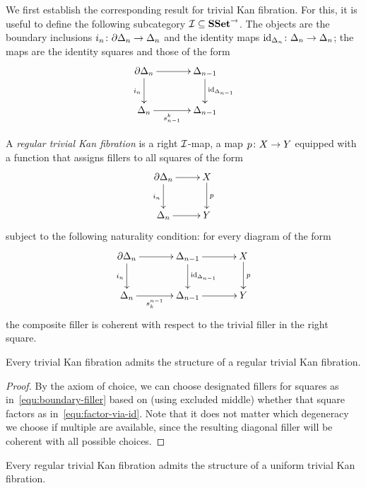 \documentclass[reqno,10pt,a4paper,oneside]{amsart}
\begin{document}
 We first establish the corresponding result for 
 trivial Kan fibration. For this, it is useful to define the following subcategory $\cal{I} \subseteq \SSet^\to$. The objects are the boundary inclusions
$i_n \co \partial \Delta_n \to \Delta_n$ and the identity maps $\id_{\Delta_n} \co \Delta_n \to \Delta_n$; the
maps are the identity squares and those of the form
 \[
\xymatrix@C=1.2cm{
  \partial \Delta_n
  \ar[r]
  \ar[d]_{i_n}
&
  \Delta_{n-1}
  \ar[d]^{\id_{\Delta_{n-1}}}
\\
  \Delta_n
  \ar[r]_-{s^k_{n-1}}
&
  \Delta_{n-1}
}
\] 


\begin{definition} A \emph{regular trivial Kan fibration} is a right $\cal{I}$-map, \ie a map $p \co X \to Y$ 
equipped with a function that assigns fillers to all squares of the form
\begin{equation}
\label{equ:boundary-filler}
\xycenter{
\partial \Delta_n \ar[d]_{i_n} \ar[r] & X \ar[d]^{p} \\
\Delta_n \ar[r] & Y } 
\end{equation}
subject to the following naturality condition: for every diagram of the form
\begin{equation}
\label{equ:factor-via-id}
{\vcenter{\hbox{\xymatrix@C=1.2cm{
  \partial \Delta_n
  \ar[r]
  \ar[d]_{i_n}
&
  \Delta_{n-1}
  \ar[r]
  \ar[d]^{\id_{\Delta_{n-1}}}
&
  X
  \ar[d]^{p}
\\
  \Delta_n
  \ar[r]_-{s_k^{n-1}}
&
  \Delta_{n-1}
  \ar[r]
&
  Y
}}}}
\end{equation}
the composite filler is coherent with respect to the trivial filler in the right square. 
\end{definition}


\begin{lemma}[ZFC] \label{triv-Kan-is-regular}
Every trivial Kan fibration admits the structure of a regular trivial Kan fibration.
\end{lemma}

\begin{proof} By the axiom of choice, we can choose  designated fillers for squares as in~\eqref{equ:boundary-filler}
 based on (using excluded middle) whether that square factors as in~\eqref{equ:factor-via-id}. Note that it does not matter which degeneracy we choose if multiple are available, since the resulting diagonal filler will be coherent with 
 all possible choices.
\end{proof} 


\begin{lemma} \label{reg-triv-is-unif-Kan}
Every regular trivial Kan fibration admits the structure of a uniform trivial Kan fibration.
\end{lemma}
\end{document}
